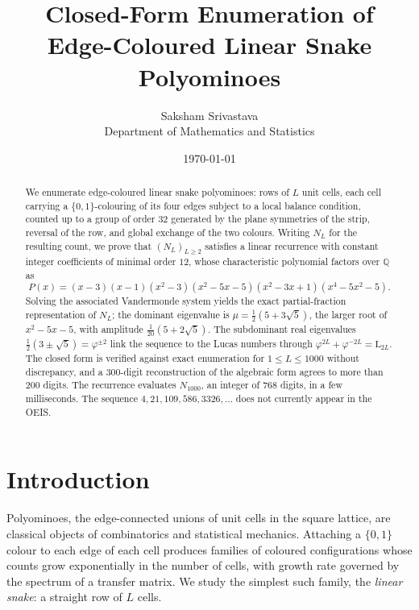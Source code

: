 \documentclass[11pt,a4paper]{article}
\title{\bfseries Closed-Form Enumeration of\\ Edge-Coloured Linear Snake Polyominoes}
\author{Saksham Srivastava\\[2pt]\small Department of Mathematics and Statistics}
\date{\today}
\theoremstyle{plain}
\theoremstyle{definition}
\theoremstyle{remark}
\newcommand{\Q}{\mathbb{Q}}
\newcommand{\golden}{\varphi}
\numberwithin{equation}{section}
\begin{document}
\maketitle
\thispagestyle{empty}

\begin{abstract}
\noindent
We enumerate edge-coloured linear snake polyominoes: rows of $L$ unit
cells, each cell carrying a $\{0,1\}$-colouring of its four edges subject
to a local balance condition, counted up to a group of order $32$
generated by the plane symmetries of the strip, reversal of the row, and
global exchange of the two colours. Writing $N_L$ for the resulting
count, we prove that $(N_L)_{L\ge 2}$ satisfies a linear recurrence with
constant integer coefficients of minimal order $12$, whose characteristic
polynomial factors over $\Q$ as
\[
P(x)=(x-3)(x-1)(x^{2}-3)(x^{2}-5x-5)(x^{2}-3x+1)(x^{4}-5x^{2}-5).
\]
Solving the associated Vandermonde system yields the exact partial-fraction
representation of $N_L$; the dominant eigenvalue is
$\mu=\tfrac12(5+3\sqrt5)$, the larger root of $x^{2}-5x-5$, with amplitude
$\tfrac1{20}(5+2\sqrt5)$. The subdominant real eigenvalues
$\tfrac12(3\pm\sqrt5)=\golden^{\pm2}$ link the sequence to the Lucas
numbers through $\golden^{2L}+\golden^{-2L}=\mathrm L_{2L}$. The closed
form is verified against exact enumeration for $1\le L\le 1000$ without
discrepancy, and a $300$-digit reconstruction of the algebraic form agrees
to more than $200$ digits. The recurrence evaluates $N_{1000}$, an integer
of $768$ digits, in a few milliseconds. The sequence
$4,21,109,586,3326,\dots$ does not currently appear in the OEIS.
\end{abstract}

\clearpage
\tableofcontents
\thispagestyle{empty}
\clearpage

\section{Introduction}\label{sec:intro}

Polyominoes, the edge-connected unions of unit cells in the square
lattice, are classical objects of combinatorics and statistical
mechanics. Attaching a $\{0,1\}$ colour to each edge of each cell produces
families of coloured configurations whose counts grow exponentially in the
number of cells, with growth rate governed by the spectrum of a transfer
matrix. We study the simplest such family, the \emph{linear snake}: a
straight row of $L$ cells.
\end{document}
